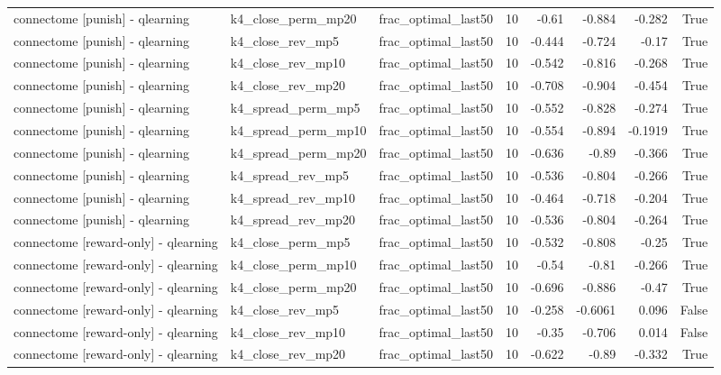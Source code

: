 \begin{table}[t]
\begin{tabular}{lllrrrrr}
connectome [punish] - qlearning & k4\_close\_perm\_mp20 & frac\_optimal\_last50 & 10 & -0.61 & -0.884 & -0.282 & True \\
connectome [punish] - qlearning & k4\_close\_rev\_mp5 & frac\_optimal\_last50 & 10 & -0.444 & -0.724 & -0.17 & True \\
connectome [punish] - qlearning & k4\_close\_rev\_mp10 & frac\_optimal\_last50 & 10 & -0.542 & -0.816 & -0.268 & True \\
connectome [punish] - qlearning & k4\_close\_rev\_mp20 & frac\_optimal\_last50 & 10 & -0.708 & -0.904 & -0.454 & True \\
connectome [punish] - qlearning & k4\_spread\_perm\_mp5 & frac\_optimal\_last50 & 10 & -0.552 & -0.828 & -0.274 & True \\
connectome [punish] - qlearning & k4\_spread\_perm\_mp10 & frac\_optimal\_last50 & 10 & -0.554 & -0.894 & -0.1919 & True \\
connectome [punish] - qlearning & k4\_spread\_perm\_mp20 & frac\_optimal\_last50 & 10 & -0.636 & -0.89 & -0.366 & True \\
connectome [punish] - qlearning & k4\_spread\_rev\_mp5 & frac\_optimal\_last50 & 10 & -0.536 & -0.804 & -0.266 & True \\
connectome [punish] - qlearning & k4\_spread\_rev\_mp10 & frac\_optimal\_last50 & 10 & -0.464 & -0.718 & -0.204 & True \\
connectome [punish] - qlearning & k4\_spread\_rev\_mp20 & frac\_optimal\_last50 & 10 & -0.536 & -0.804 & -0.264 & True \\
connectome [reward-only] - qlearning & k4\_close\_perm\_mp5 & frac\_optimal\_last50 & 10 & -0.532 & -0.808 & -0.25 & True \\
connectome [reward-only] - qlearning & k4\_close\_perm\_mp10 & frac\_optimal\_last50 & 10 & -0.54 & -0.81 & -0.266 & True \\
connectome [reward-only] - qlearning & k4\_close\_perm\_mp20 & frac\_optimal\_last50 & 10 & -0.696 & -0.886 & -0.47 & True \\
connectome [reward-only] - qlearning & k4\_close\_rev\_mp5 & frac\_optimal\_last50 & 10 & -0.258 & -0.6061 & 0.096 & False \\
connectome [reward-only] - qlearning & k4\_close\_rev\_mp10 & frac\_optimal\_last50 & 10 & -0.35 & -0.706 & 0.014 & False \\
connectome [reward-only] - qlearning & k4\_close\_rev\_mp20 & frac\_optimal\_last50 & 10 & -0.622 & -0.89 & -0.332 & True \\

\end{tabular}
\end{table}
